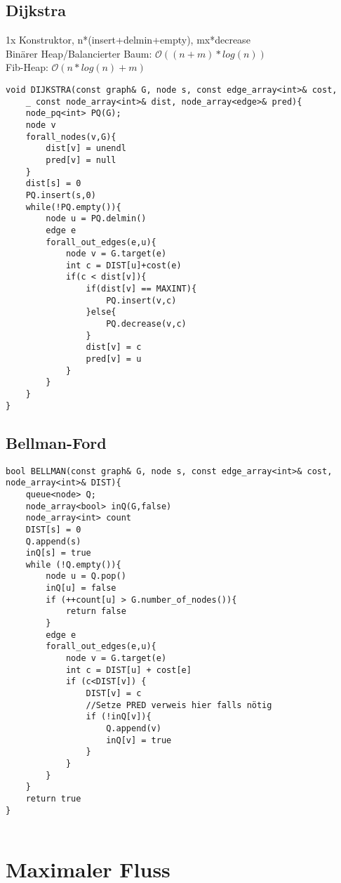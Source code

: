 \documentclass[a4paper]{article}
\newcommand{\oh}[1]{$\mathcal{O}(#1)$}
\begin{document}
\subsection{Dijkstra}
1x Konstruktor, n*(insert+delmin+empty), mx*decrease\\
Binärer Heap/Balancierter Baum: \oh{(n+m)*log(n)}\\
Fib-Heap: \oh{n*log(n)+m}
\begin{lstlisting}
void DIJKSTRA(const graph& G, node s, const edge_array<int>& cost, 
	_ const node_array<int>& dist, node_array<edge>& pred){
	node_pq<int> PQ(G);
	node v
	forall_nodes(v,G){
		dist[v] = unendl
		pred[v] = null
	}
	dist[s] = 0
	PQ.insert(s,0)
	while(!PQ.empty()){
		node u = PQ.delmin()
		edge e
		forall_out_edges(e,u){
			node v = G.target(e)
			int c = DIST[u]+cost(e)
			if(c < dist[v]){
				if(dist[v] == MAXINT){
					PQ.insert(v,c)
				}else{
					PQ.decrease(v,c)
				}
				dist[v] = c
				pred[v] = u
			}
		}
	}
}
\end{lstlisting}
\subsection{Bellman-Ford}
\begin{lstlisting}
bool BELLMAN(const graph& G, node s, const edge_array<int>& cost, node_array<int>& DIST){
	queue<node> Q;
	node_array<bool> inQ(G,false)
	node_array<int> count
	DIST[s] = 0
	Q.append(s)
	inQ[s] = true
	while (!Q.empty()){
		node u = Q.pop()
		inQ[u] = false
		if (++count[u] > G.number_of_nodes()){
			return false
		}
		edge e
		forall_out_edges(e,u){
			node v = G.target(e)
			int c = DIST[u] + cost[e]
			if (c<DIST[v]) {
				DIST[v] = c
				//Setze PRED verweis hier falls nötig
				if (!inQ[v]){
					Q.append(v)
					inQ[v] = true
				}
			}
		}
	}
	return true
}
				
\end{lstlisting}
\section{Maximaler Fluss}
\end{document}
